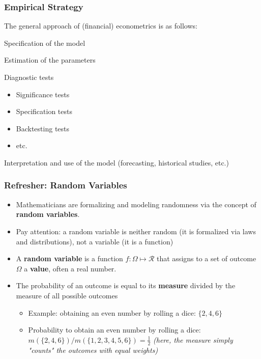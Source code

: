 \documentclass{beamer}
\newenvironment{wideenumerate}{\enumerate\addtolength{\itemsep}{10pt}}{\endenumerate}
\begin{document}
\begin{frame}
  \frametitle{Empirical Strategy}
  The general approach of (financial) econometrics is as follows:\\
  \smallskip

  \begin{wideenumerate}
  \item Specification of the model
  \item Estimation of the parameters
  \item Diagnostic tests
    \begin{itemize}
    \item Significance tests
    \item Specification tests
    \item Backtesting tests
    \item etc.
    \end{itemize}
  \item Interpretation and use of the model (forecasting, historical studies, etc.)
  \end{wideenumerate}
  
\end{frame}


\begin{frame}
  \frametitle{Refresher: Random Variables}
  \begin{itemize}
  \item Mathematicians are formalizing and modeling randomness via the concept of \textbf{random variables}.\\
  \item Pay attention: a random variable is neither random (it is formalized via laws and distributions), not a variable (it is a function)
  \item A \textbf{random variable} is a function $f: \Omega \mapsto \mathcal{R}$ that assigns to
      a set of outcome $\Omega$ a \textbf{value}, often a real number.
  \item The probability of an outcome is equal to its \textbf{measure} divided by
        the measure of all possible outcomes
     \begin{itemize}
      \item Example: obtaining an even number by rolling a dice: $\{2, 4, 6\}$
      \item Probability to obtain an even number by rolling a dice: $m(\{2, 4,
        6\})/m(\{1, 2, 3, 4, 5, 6\}) = \frac{1}{2}$ \emph{(here, the measure
          simply "counts" the outcomes with equal weights)}
        \end{itemize}     
  \end{itemize}  
\end{frame}
\end{document}
